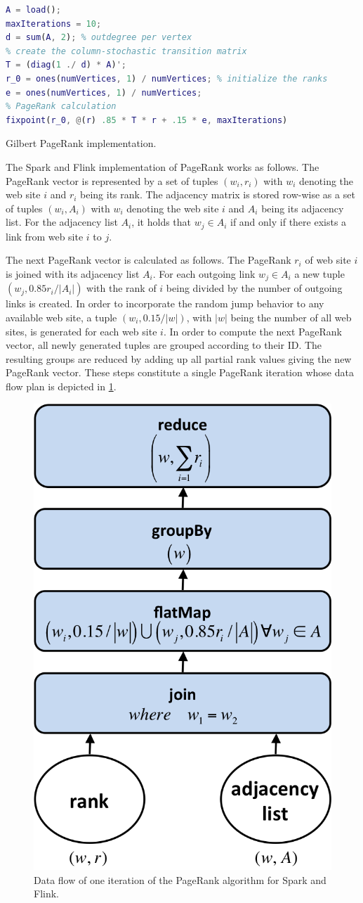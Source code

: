 \begin{listing}[!h]
	\begin{CenteredBox}
		\begin{lstlisting}[language=Matlab,
		commentstyle=\color{black},
		  stringstyle=\color{black},
		  keywordstyle=\color{black}\bfseries,
		  morekeywords={ones, fixpoint},]
% load adjacency matrix
A = load();
maxIterations = 10;
d = sum(A, 2); % outdegree per vertex
% create the column-stochastic transition matrix
T = (diag(1 ./ d) * A)'; 
r_0 = ones(numVertices, 1) / numVertices; % initialize the ranks
e = ones(numVertices, 1) / numVertices;
% PageRank calculation
fixpoint(r_0, @(r) .85 * T * r + .15 * e, maxIterations)
		\end{lstlisting}
	\end{CenteredBox}
	\caption{Gilbert PageRank implementation.}
	\label{lst:gilbertPageRank}
\end{listing}

The Spark and Flink implementation of PageRank works as follows.
The PageRank vector is represented by a set of tuples $(w_i, r_i)$ with $w_i$ denoting the web site $i$ and $r_i$ being its rank.
The adjacency matrix is stored row-wise as a set of tuples $(w_i, A_i)$ with $w_i$ denoting the web site $i$ and $A_i$ being its adjacency list.
For the adjacency list $A_i$, it holds that $w_j \in A_i$ if and only if there exists a link from web site $i$ to $j$.

The next PageRank vector is calculated as follows.
The PageRank $r_i$ of web site $i$ is joined with its adjacency list $A_i$.
For each outgoing link $w_j \in A_i$ a new tuple $(w_j, 0.85r_i/\left|A_i\right|)$ with the rank of $i$ being divided by the number of outgoing links is created.
In order to incorporate the random jump behavior to any available web site, a tuple $(w_i, 0.15/|w|)$, with $|w|$ being the number of all web sites, is generated for each web site $i$.
In order to compute the next PageRank vector, all newly generated tuples are grouped according to their ID.
The resulting groups are reduced by adding up all partial rank values giving the new PageRank vector.
These steps constitute a single PageRank iteration whose data flow plan is depicted in \cref{fig:pageRankDataFlow}.

\begin{figure}[!h]
	\centering
	\includegraphics[width=.3\linewidth]{images/pageRankStep.png}
	\caption{Data flow of one iteration of the PageRank algorithm for Spark and Flink.}
	\label{fig:pageRankDataFlow}
\end{figure}

